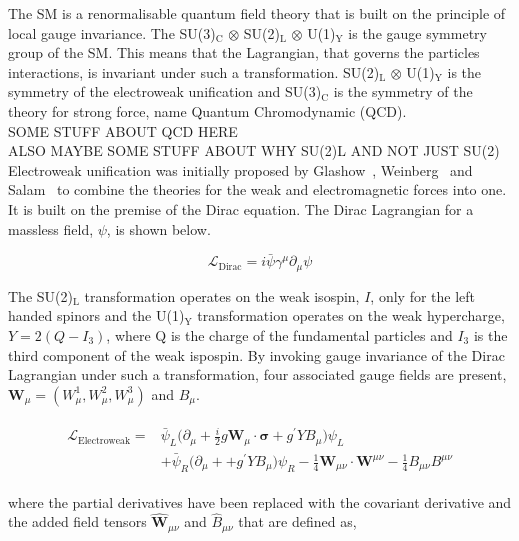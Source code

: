 The SM is a renormalisable quantum field theory that is built on the principle of local gauge invariance.
The SU(3)$_{\text{C}}$ $\otimes$ SU(2)$_{\text{L}}$ $\otimes$ U(1)$_{\text{Y}}$ is the gauge symmetry group of the SM.
This means that the Lagrangian, that governs the particles interactions, is invariant under such a transformation. 
SU(2)$_{\text{L}}$ $\otimes$ U(1)$_{\text{Y}}$ is the symmetry of the electroweak unification and SU(3)$_{\text{C}}$ is the symmetry of the theory for strong force, name Quantum Chromodynamic (QCD). \\

SOME STUFF ABOUT QCD HERE \\
ALSO MAYBE SOME STUFF ABOUT WHY SU(2)L AND NOT JUST SU(2) \\


Electroweak unification was initially proposed by Glashow~\cite{}, Weinberg~\cite{} and Salam~\cite{} to combine the theories for the weak and electromagnetic forces into one.
It is built on the premise of the Dirac equation.
The Dirac Lagrangian for a massless field, $\psi$, is shown below.

\begin{equation}
\mathcal{L}_{\text{Dirac}} = i\bar{\psi}\gamma^{\mu} \partial_{\mu} \psi
\end{equation}

The SU(2)$_{\text{L}}$ transformation operates on the weak isospin, $I$, only for the left handed spinors and the U(1)$_{\text{Y}}$ transformation operates on the weak hypercharge, $Y=2(Q-I_{3})$, where Q is the charge of the fundamental particles and $I_3$ is the third component of the weak ispospin.
By invoking gauge invariance of the Dirac Lagrangian under such a transformation, four associated gauge fields are present, $\boldsymbol{W}_{\mu} = (W^{1}_{\mu},W^{2}_{\mu},W^{3}_{\mu})$ and $B_{\mu}$.

\begin{align}
\begin{split}
\mathcal{L}_{\text{Electroweak}} = &\bar{\psi}_{L}\Big(\partial_{\mu} + \frac{i}{2} g \boldsymbol{W}_{\mu} \cdot \boldsymbol{\sigma} + g^{\prime} Y B_{\mu}  \Big) \psi_L \\
& + \bar{\psi}_{R}\Big(\partial_{\mu} + + g^{\prime} Y B_{\mu}  \Big) \psi_R - \frac{1}{4} \boldsymbol{W}_{\mu\nu} \cdot \boldsymbol{W}^{\mu\nu} - \frac{1}{4}B_{\mu\nu}B^{\mu\nu}
\end{split}
\end{align}

where the partial derivatives have been replaced with the covariant derivative and the added field tensors $\hat{\boldsymbol{W}}_{\mu\nu}$ and $\hat{B}_{\mu\nu}$ that are defined as,


